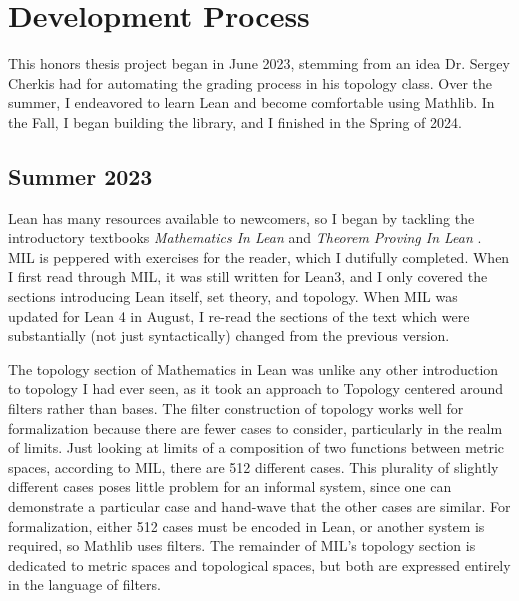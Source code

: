 

\chapter[Development]{Development Process}

This honors thesis project began in June 2023, stemming from
an idea Dr. Sergey Cherkis had for automating the grading
process in his topology class. Over the summer, I endeavored
to learn Lean and become comfortable using Mathlib. In the Fall,
I began building the library, and I finished in the Spring of 2024.

\section{Summer 2023}

Lean has many resources available to newcomers, so I began
by tackling the introductory textbooks \textit{Mathematics In Lean} \cite{MIL} and
\textit{Theorem Proving In Lean} \cite{TPiL}. MIL is peppered with
exercises for the reader, which I dutifully completed. When
I first read through MIL, it was still written for Lean3, and I only 
covered the sections introducing Lean itself, set theory, and
topology. When MIL was updated for Lean 4 in August, I re-read the
sections of the text which were substantially (not just syntactically)
changed from the previous version.

The topology section of Mathematics in Lean was unlike any other
introduction to topology I had ever seen, as it took 
an approach to Topology centered around filters rather than bases. 
The filter construction of topology works well for formalization 
because there are fewer cases to consider, particularly
in the realm of limits. Just looking at limits of a composition of two 
functions between metric spaces, according to MIL, there are 512 different 
cases. This plurality of slightly different cases poses little problem 
for an informal system, since one can demonstrate a particular case and
hand-wave that the other cases are similar. For formalization, 
either 512 cases must be encoded in Lean, or another system is required,
so Mathlib uses filters. The remainder of MIL's topology section
is dedicated to metric spaces and topological spaces, but both
are expressed entirely in the language of filters.

